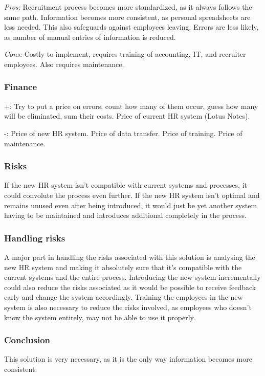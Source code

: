 \emph{Pros:} Recruitment process becomes more standardized, as it always follows the same path.
Information becomes more consistent, as personal spreadsheets are less needed. 
This also safeguards against employees leaving.
Errors are less likely, as number of manual entries of information is reduced.

\emph{Cons:} Costly to implement, requires training of accounting, IT, and recruiter employees.
Also requires maintenance.

\subsubsection{Finance} +: Try to put a price on errors, count how many of them occur, guess how many will be eliminated, sum their costs.
Price of current HR system (Lotus Notes).

-: Price of new HR system.
Price of data transfer.
Price of training.
Price of maintenance.

\subsubsection{Risks}
If the new HR system isn't compatible with current systems and processes, it could convolute the process even further. 
If the new HR system isn't optimal and remains unused even after being introduced, it would just be yet another system having to be maintained and introduces additional completely in the process.

\subsubsection{Handling risks}
A major part in handling the risks associated with this solution is analysing the new HR system and making it absolutely sure that it's compatible with the current systems and the entire process. 
Introducing the new system incrementally could also reduce the risks associated as it would be possible to receive feedback early and change the system accordingly. 
Training the employees in the new system is also necessary to reduce the risks involved, as employees who doesn't know the system entirely, may not be able to use it properly.

\subsubsection{Conclusion} This solution is very necessary, as it is the only way information becomes more consistent.

